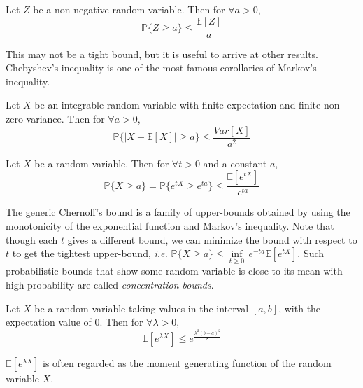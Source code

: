 \documentclass{article}
\begin{document}
\begin{lemma}
Let $Z$ be a non-negative random variable. Then for $\forall a > 0$,
$$\mathbb{P}\{Z \geq a\} \leq \frac{\mathbb{E}[Z]}{a}$$
\end{lemma}

This may not be a tight bound, but it is useful to arrive at other results. Chebyshev's inequality is one of the most famous corollaries of Markov's inequality.

\begin{lemma}
Let $X$ be an integrable random variable with finite expectation and finite non-zero variance. Then for $\forall a > 0$,
$$\mathbb{P}\{|X - \mathbb{E}[X]| \geq a\} \leq \frac{Var[X]}{a^2}$$
\end{lemma}

\begin{lemma}
Let $X$ be a random variable. Then for $\forall t > 0$ and a constant $a$,
$$\mathbb{P}\{X \geq a\} = \mathbb{P}\{e^{tX} \geq e^{ta}\} \leq \frac{\mathbb{E}[e^{tX}]}{e^{ta}}$$
\end{lemma}
The generic Chernoff's bound is a family of upper-bounds obtained by using the monotonicity of the exponential function and Markov's inequality. Note that though each $t$ gives a different bound, we can minimize the bound with respect to $t$ to get the tightest upper-bound, \textit{i.e.} $\mathbb{P}\{X \geq a\} \leq  \underset{t  \geq 0}{\inf}\,  e^{-ta} \mathbb{E}[e^{tX}] $. Such probabilistic bounds that show some random variable is close to its mean with high probability are called \emph{concentration bounds}.

\begin{lemma}
Let $X$ be a random variable taking values in the interval $[a, b]$, with the expectation value of $0$. Then for $\forall \lambda > 0$,
$$\mathbb{E}[e^{\lambda X}] \leq e^{\frac{\lambda^2 (b - a)^2}{8}}$$
\end{lemma}
$\mathbb{E}[e^{\lambda X}]$ is often regarded as the moment generating function of the random variable $X$.
\end{document}
